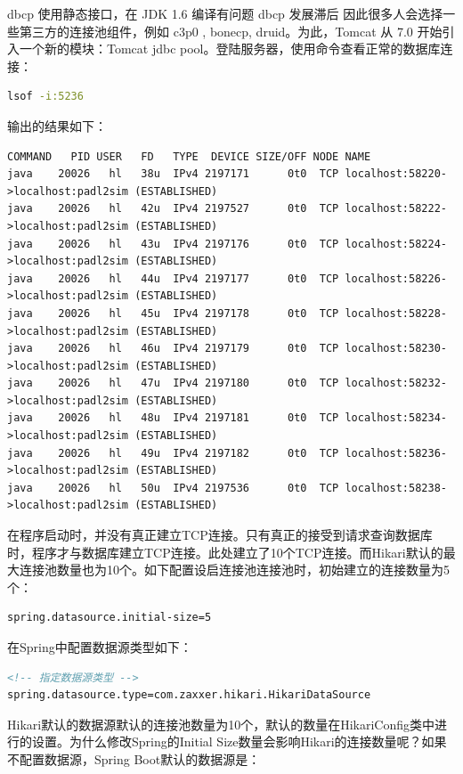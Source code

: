 \documentclass[11pt,fleqn]{book}
\numberwithin{dummy}{section}
\theoremstyle{ocrenumbox}
\theoremstyle{blacknumex}
\theoremstyle{blacknumbox}
\theoremstyle{ocrenum}
\begin{document}
dbcp 使用静态接口，在 JDK 1.6 编译有问题
dbcp 发展滞后
因此很多人会选择一些第三方的连接池组件，例如 c3p0 , bonecp, druid。为此，Tomcat 从 7.0 开始引入一个新的模块：Tomcat jdbc pool。登陆服务器，使用命令查看正常的数据库连接：

\begin{lstlisting}[language=Bash]
lsof -i:5236
\end{lstlisting}

输出的结果如下：

\begin{lstlisting}
COMMAND   PID USER   FD   TYPE  DEVICE SIZE/OFF NODE NAME
java    20026   hl   38u  IPv4 2197171      0t0  TCP localhost:58220->localhost:padl2sim (ESTABLISHED)
java    20026   hl   42u  IPv4 2197527      0t0  TCP localhost:58222->localhost:padl2sim (ESTABLISHED)
java    20026   hl   43u  IPv4 2197176      0t0  TCP localhost:58224->localhost:padl2sim (ESTABLISHED)
java    20026   hl   44u  IPv4 2197177      0t0  TCP localhost:58226->localhost:padl2sim (ESTABLISHED)
java    20026   hl   45u  IPv4 2197178      0t0  TCP localhost:58228->localhost:padl2sim (ESTABLISHED)
java    20026   hl   46u  IPv4 2197179      0t0  TCP localhost:58230->localhost:padl2sim (ESTABLISHED)
java    20026   hl   47u  IPv4 2197180      0t0  TCP localhost:58232->localhost:padl2sim (ESTABLISHED)
java    20026   hl   48u  IPv4 2197181      0t0  TCP localhost:58234->localhost:padl2sim (ESTABLISHED)
java    20026   hl   49u  IPv4 2197182      0t0  TCP localhost:58236->localhost:padl2sim (ESTABLISHED)
java    20026   hl   50u  IPv4 2197536      0t0  TCP localhost:58238->localhost:padl2sim (ESTABLISHED)
\end{lstlisting}

在程序启动时，并没有真正建立TCP连接。只有真正的接受到请求查询数据库时，程序才与数据库建立TCP连接。此处建立了10个TCP连接。而Hikari默认的最大连接池数量也为10个。如下配置设启连接池连接池时，初始建立的连接数量为5个：

\begin{lstlisting}
spring.datasource.initial-size=5
\end{lstlisting}

在Spring中配置数据源类型如下：

\begin{lstlisting}[language=XML]
<!-- 指定数据源类型 -->
spring.datasource.type=com.zaxxer.hikari.HikariDataSource
\end{lstlisting}

Hikari默认的数据源默认的连接池数量为10个，默认的数量在HikariConfig类中进行的设置。为什么修改Spring的Initial Size数量会影响Hikari的连接数量呢？如果不配置数据源，Spring Boot默认的数据源是：
\end{document}
